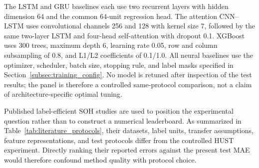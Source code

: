 \documentclass[pdflatex,sn-mathphys-num]{sn-jnl}
\begin{document}
The LSTM and GRU baselines each use two recurrent layers with hidden dimension 64 and the common 64-unit regression head. The attention CNN--LSTM uses convolutional channels 256 and 128 with kernel size 7, followed by the same two-layer LSTM and four-head self-attention with dropout 0.1. XGBoost uses 300 trees, maximum depth 6, learning rate 0.05, row and column subsampling of 0.8, and L1/L2 coefficients of 0.1/1.0. All neural baselines use the optimizer, scheduler, batch size, stopping rule, and label masks specified in Section~\ref{subsec:training_config}. No model is retuned after inspection of the test results; the panel is therefore a controlled same-protocol comparison, not a claim of architecture-specific optimal tuning.

Published label-efficient SOH studies are used to position the experimental question rather than to construct a numerical leaderboard. As summarized in Table~\ref{tab:literature_protocols}, their datasets, label units, transfer assumptions, feature representations, and test protocols differ from the controlled HUST experiment. Directly ranking their reported errors against the present test MAE would therefore confound method quality with protocol choice.
\end{document}
